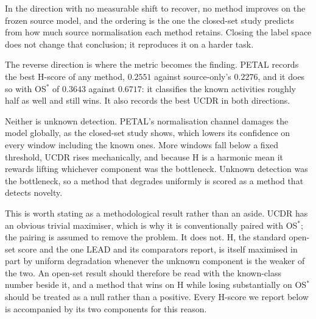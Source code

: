 In the direction with no measurable shift to recover, no method improves on the frozen
source model, and the ordering is the one the closed-set study predicts from how
much source normalisation each method retains. Closing the label space does not change
that conclusion; it reproduces it on a harder task.

The reverse direction is where the metric becomes the finding. PETAL records the best
H-score of any method, $0.2551$ against source-only's $0.2276$, and it does so with
OS$^{*}$ of $0.3643$ against $0.6717$: it classifies the known activities roughly half as
well and still wins. It also records the best UCDR in both directions.

Neither is unknown detection. PETAL's normalisation channel damages the model globally, as
the closed-set study shows, which lowers its confidence on every window including the
known ones. More windows fall below a fixed threshold, UCDR rises mechanically, and
because H is a harmonic mean it rewards lifting whichever component was the bottleneck.
Unknown detection was the bottleneck, so a method that degrades uniformly is scored as a
method that detects novelty.

This is worth stating as a methodological result rather than an aside. UCDR has an obvious
trivial maximiser, which is why it is conventionally paired with OS$^{*}$; the pairing is
assumed to remove the problem. It does not. H, the standard open-set score and the one
LEAD and its comparators report, is itself maximised in part by uniform degradation
whenever the unknown component is the weaker of the two. An open-set result should
therefore be read with the known-class number beside it, and a method that wins on H while
losing substantially on OS$^{*}$ should be treated as a null rather than a positive. Every
H-score we report below is accompanied by its two components for this reason.
